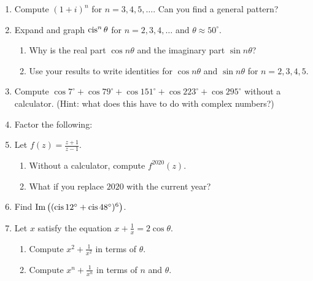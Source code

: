 \documentclass[../gatm.tex]{subfiles}
\begin{document}
\begin{enumerate}
\item Compute $(1+i)^n$ for $n=3,4,5,\ldots$. Can you find a general pattern? %
\item Expand and graph $\operatorname{cis}^n \theta$ for $n=2,3,4,\ldots$ and $\theta\approx 50^\circ$. %

\begin{enumerate}
\item Why is the real part $\cos n\theta$ and the imaginary part $\sin n\theta$? %
\item Use your results to write identities for $\cos n\theta$ and $\sin n\theta$ for $n=2,3,4,5$. %
\end{enumerate}

\newcommand{\cosdeg}[1] {\cos #1^\circ}

\item Compute $\cosdeg{7} + \cosdeg{79} + \cosdeg{151} + \cosdeg{223} + \cosdeg{295}$ without a calculator. (Hint: what does this have to do with complex numbers?) %
\item Factor the following: %
\begin{enumerate}
\end{enumerate}

\item Let $f(z)=\frac{z+1}{z-1}$. %
\begin{enumerate}
\item Without a calculator, compute $f^{2020}(z)$. %
\item What if you replace $2020$ with the current year? %
\end{enumerate}

\item Find $\operatorname{Im}\left((\operatorname{cis} 12^\circ + \operatorname{cis} 48^\circ)^6\right)$. %

\item Let $x$ satisfy the equation $x+\frac{1}{x}=2\cos\theta$. %
\begin{enumerate}
\item Compute $x^2+\frac{1}{x^2}$ in terms of $\theta$. %
\item Compute $x^n+\frac{1}{x^n}$ in terms of $n$ and $\theta$. %
\end{enumerate}
\end{enumerate}
\end{document}
